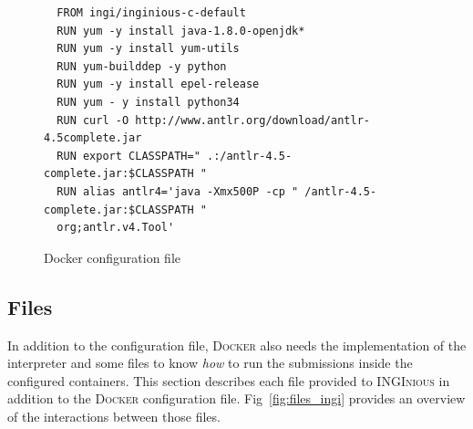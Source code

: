 \documentclass[11pt,a4paper,twoside,openright]{report}
\begin{document}
\begin{figure}
  \begin{lstlisting}
  FROM ingi/inginious-c-default
  RUN yum -y install java-1.8.0-openjdk*
  RUN yum -y install yum-utils
  RUN yum-builddep -y python
  RUN yum -y install epel-release
  RUN yum - y install python34
  RUN curl -O http://www.antlr.org/download/antlr-4.5complete.jar
  RUN export CLASSPATH=" .:/antlr-4.5-complete.jar:$CLASSPATH "
  RUN alias antlr4='java -Xmx500P -cp " /antlr-4.5-complete.jar:$CLASSPATH " 
  org;antlr.v4.Tool'
  \end{lstlisting}
  \caption{Docker configuration file}
  \label{fig:docker_cfg}
\end{figure}

\subsection{Files}
In addition to the configuration file, \textsc{Docker} also needs the 
implementation of the interpreter and some files to know \textit{how} to run 
the submissions inside the configured containers. This section describes each 
file provided to \textsc{INGInious} in addition to the \textsc{Docker} 
configuration file. Fig~\ref{fig:files_ingi} provides an overview of the 
interactions between those files.
\end{document}
